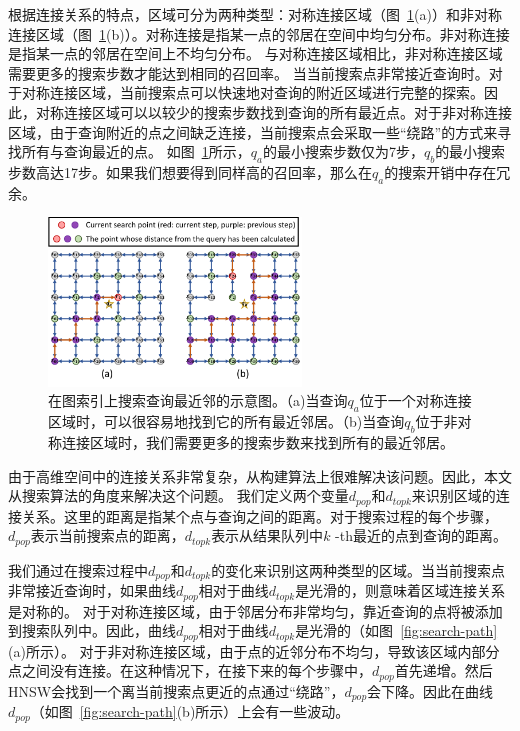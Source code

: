 根据连接关系的特点，区域可分为两种类型：对称连接区域（图~\ref{fig:grid}(a)）和非对称连接区域（图~\ref{fig:grid}(b)）。对称连接是指某一点的邻居在空间中均匀分布。非对称连接是指某一点的邻居在空间上不均匀分布。
与对称连接区域相比，非对称连接区域需要更多的搜索步数才能达到相同的召回率。 
当当前搜索点非常接近查询时。对于对称连接区域，当前搜索点可以快速地对查询的附近区域进行完整的探索。因此，对称连接区域可以以较少的搜索步数找到查询的所有最近点。对于非对称连接区域，由于查询附近的点之间缺乏连接，当前搜索点会采取一些“绕路”的方式来寻找所有与查询最近的点。 如图~\ref{fig:grid}所示，$q_a$的最小搜索步数仅为7步，$q_b$的最小搜索步数高达17步。如果我们想要得到同样高的召回率，那么在$q_a$的搜索开销中存在冗余。
\begin{figure}[tp]
  \centering
  \includegraphics[width=0.6\textwidth]{figures/context-1/grid.pdf}
  \caption{在图索引上搜索查询最近邻的示意图。（a)当查询$q_a$位于一个对称连接区域时，可以很容易地找到它的所有最近邻居。（b)当查询$q_b$位于非对称连接区域时，我们需要更多的搜索步数来找到所有的最近邻居。}
  \label{fig:grid}
\end{figure}

由于高维空间中的连接关系非常复杂，从构建算法上很难解决该问题。因此，本文从搜索算法的角度来解决这个问题。
我们定义两个变量$d_{pop}$和$d_{topk}$来识别区域的连接关系。这里的距离是指某个点与查询之间的距离。对于搜索过程的每个步骤，$d_{pop}$表示当前搜索点的距离，$d_{topk}$表示从结果队列中$k$ -th最近的点到查询的距离。

我们通过在搜索过程中$d_{pop}$和$d_{topk}$的变化来识别这两种类型的区域。当当前搜索点非常接近查询时，如果曲线$d_{pop}$相对于曲线$d_{topk}$是光滑的，则意味着区域连接关系是对称的。
对于对称连接区域，由于邻居分布非常均匀，靠近查询的点将被添加到搜索队列中。因此，曲线$d_{pop}$相对于曲线$d_{topk}$是光滑的（如图~\ref{fig:search-path}(a)所示）。
对于非对称连接区域，由于点的近邻分布不均匀，导致该区域内部分点之间没有连接。在这种情况下，在接下来的每个步骤中，$d_{pop}$首先递增。然后HNSW会找到一个离当前搜索点更近的点通过“绕路”，$d_{pop}$会下降。因此在曲线$d_{pop}$（如图~\ref{fig:search-path}(b)所示）上会有一些波动。

